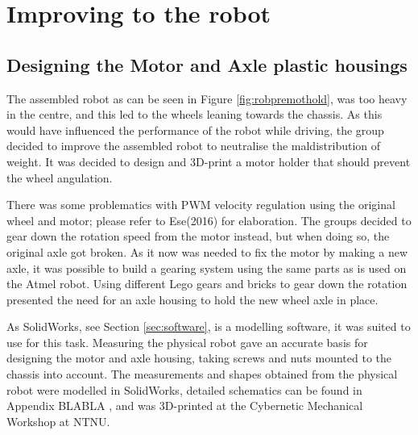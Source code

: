 \section{Improving to the robot}
\label{sec:improvements}

\subsection{Designing the Motor and Axle plastic housings}
The assembled robot as can be seen in Figure \ref{fig:robpremothold}, was too heavy in the centre, and this led to the wheels leaning towards the chassis. As this would have influenced the performance of the robot while driving, the group decided to improve the assembled robot to neutralise the maldistribution of weight. It was decided to design and 3D-print a motor holder that should prevent the wheel angulation.

There was some problematics with PWM velocity regulation using the original wheel and motor; please refer to Ese(2016) for elaboration. The groups decided to gear down the rotation speed from the motor instead, but when doing so, the original axle got broken. As it now was needed to fix the motor by making a new axle, it was possible to build a gearing system using the same parts as is used on the Atmel robot. Using different Lego gears and bricks to gear down the rotation presented the need for an axle housing to hold the new wheel axle in place.

As SolidWorks, see Section \ref{sec:software}, is a modelling software, it was suited to use for this task. Measuring the physical robot gave an accurate basis for designing the motor and axle housing, taking screws and nuts mounted to the chassis into account. The measurements and shapes obtained from the physical robot were modelled in SolidWorks, detailed schematics can be found in Appendix BLABLA , and was 3D-printed at the Cybernetic Mechanical Workshop at NTNU.



